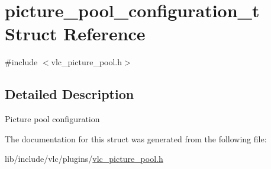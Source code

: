 \hypertarget{structpicture__pool__configuration__t}{}\section{picture\+\_\+pool\+\_\+configuration\+\_\+t Struct Reference}
\label{structpicture__pool__configuration__t}


{\ttfamily \#include $<$vlc\+\_\+picture\+\_\+pool.\+h$>$}



\subsection{Detailed Description}
Picture pool configuration 

The documentation for this struct was generated from the following file\+:\begin{DoxyCompactItemize}
\item 
lib/include/vlc/plugins/\hyperlink{vlc__picture__pool_8h}{vlc\+\_\+picture\+\_\+pool.\+h}\end{DoxyCompactItemize}
